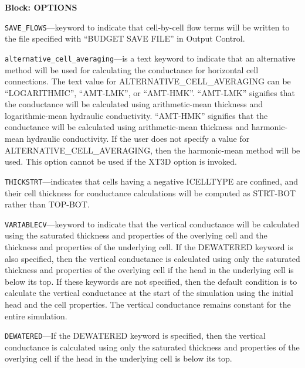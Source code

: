 
\item \textbf{Block: OPTIONS}

\begin{description}
\item \texttt{SAVE\_FLOWS}---keyword to indicate that cell-by-cell flow terms will be written to the file specified with ``BUDGET SAVE FILE'' in Output Control.

\item \texttt{alternative\_cell\_averaging}---is a text keyword to indicate that an alternative method will be used for calculating the conductance for horizontal cell connections.  The text value for ALTERNATIVE\_CELL\_AVERAGING can be ``LOGARITHMIC'', ``AMT-LMK'', or ``AMT-HMK''.  ``AMT-LMK'' signifies that the conductance will be calculated using arithmetic-mean thickness and logarithmic-mean hydraulic conductivity.  ``AMT-HMK'' signifies that the conductance will be calculated using arithmetic-mean thickness and harmonic-mean hydraulic conductivity. If the user does not specify a value for ALTERNATIVE\_CELL\_AVERAGING, then the harmonic-mean method will be used.  This option cannot be used if the XT3D option is invoked.

\item \texttt{THICKSTRT}---indicates that cells having a negative ICELLTYPE are confined, and their cell thickness for conductance calculations will be computed as STRT-BOT rather than TOP-BOT.

\item \texttt{VARIABLECV}---keyword to indicate that the vertical conductance will be calculated using the saturated thickness and properties of the overlying cell and the thickness and properties of the underlying cell.  If the DEWATERED keyword is also specified, then the vertical conductance is calculated using only the saturated thickness and properties of the overlying cell if the head in the underlying cell is below its top.  If these keywords are not specified, then the default condition is to calculate the vertical conductance at the start of the simulation using the initial head and the cell properties.  The vertical conductance remains constant for the entire simulation.

\item \texttt{DEWATERED}---If the DEWATERED keyword is specified, then the vertical conductance is calculated using only the saturated thickness and properties of the overlying cell if the head in the underlying cell is below its top.


\end{description}
